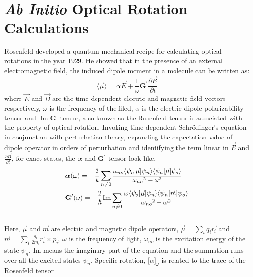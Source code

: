 \section{{\em Ab Initio} Optical Rotation Calculations}
Rosenfeld developed a quantum mechanical recipe for calculating optical rotations in the year
1929\cite{Rosenfeld29}. He showed that in the presence of an external electromagnetic field,
the induced dipole moment in a molecule can be written as:
\begin{equation}\langle\vec{\mu}\rangle = \bm{\alpha}\vec{E} + \frac{1}{\omega}\textbf{G}^\prime\frac{\partial\vec{B}}{\partial t}
\end{equation} where $\vec{E} $ and $\vec{B}$ are the time dependent electric and
magnetic field vectors respectively, $\omega$ is the frequency of the filed, $\alpha$ is the electric dipole
polarizability tensor and the $\textbf{G}^\prime$ tensor, also known as the Rosenfeld tensor is associated 
with the property of optical rotation. Invoking time-dependent Schr\"odinger's equation in conjunction 
with perturbation theory, expanding the expectation value of dipole operator in orders of perturbation 
and identifying the term linear in $\vec{E}$ and $\frac{\partial\vec{B}}{\partial t}$, 
for exact states, the $\bm{\alpha}$ and $\textbf{G}^\prime$ tensor look like,
\\
\begin{equation}
\begin{split}
& \mbox{\boldmath $\alpha$}(\omega) = -\frac{2}{\hbar} \sum_{n \neq 0}\frac{\omega_{no}\langle \psi_o |\vec{\mu}| \psi_n \rangle\langle \psi_n |\vec{\mu}| \psi_o \rangle}{{\omega_{no}}^2 - {\omega}^2 }\\
& \textbf{G}^{\prime}(\omega) = -\frac{2}{\hbar} \text{Im}\sum_{n \neq 0}\frac{\omega \langle \psi_o |\vec{\mu}| \psi_n \rangle\langle \psi_n |\vec{m}| \psi_o \rangle}{{\omega_{no}}^2 - {\omega}^2 }\\
\end{split}
\end{equation}
\\
Here, $\vec{\mu}$ and $\vec{m}$ are electric and magnetic dipole operators, 
$\vec{\mu} = \sum\limits_i q_i \vec{{r}_i}$ and $\vec{m} = \sum\limits_i \frac{q_i}{2m_i} \vec{{r}_i} \times \vec{{p}_i}$, $\omega$ is the frequency of light, $\omega_{no}$ is the excitation energy of the state $\psi_n$.
Im means the imaginary part of the equation and the summation runs over all the excited
states $\psi_n$. Specific rotation, ${\lbrack\alpha\rbrack}_\omega$ is related to the trace of the Rosenfeld tensor 
